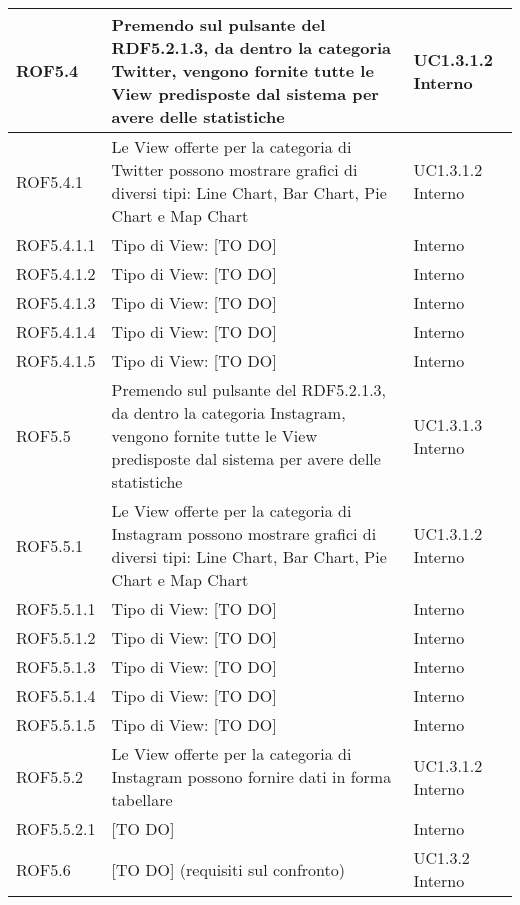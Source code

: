 \begin{center}
\begin{longtable}{| p{2cm} | p{8cm} | p{2cm} |}
		ROF5.4  &  Premendo sul pulsante del RDF5.2.1.3, da dentro la categoria Twitter, vengono fornite tutte le View predisposte dal sistema per avere delle statistiche &  UC1.3.1.2 \newline Interno \\
		\hline
		ROF5.4.1  & Le View offerte per la categoria di Twitter possono mostrare grafici di diversi tipi: Line Chart, Bar Chart, Pie Chart e Map Chart  &  UC1.3.1.2 \newline Interno \\
		\hline
		ROF5.4.1.1  &  Tipo di View: [TO DO] & Interno \\
		\hline	
		ROF5.4.1.2  &  Tipo di View: [TO DO] & Interno \\
		\hline
		ROF5.4.1.3  &  Tipo di View: [TO DO] & Interno \\
		\hline
		ROF5.4.1.4  &  Tipo di View: [TO DO] & Interno \\
		\hline
		ROF5.4.1.5  &  Tipo di View: [TO DO] & Interno \\
		\hline


		ROF5.5  &  Premendo sul pulsante del RDF5.2.1.3, da dentro la categoria Instagram, vengono fornite tutte le View predisposte dal sistema per avere delle statistiche &  UC1.3.1.3 \newline Interno \\
		\hline
		ROF5.5.1  & Le View offerte per la categoria di Instagram possono mostrare grafici di diversi tipi: Line Chart, Bar Chart, Pie Chart e Map Chart  &  UC1.3.1.2 \newline Interno \\
		\hline
		ROF5.5.1.1  &  Tipo di View: [TO DO] & Interno \\
		\hline	
		ROF5.5.1.2  &  Tipo di View: [TO DO] & Interno \\
		\hline
		ROF5.5.1.3  &  Tipo di View: [TO DO] & Interno \\
		\hline
		ROF5.5.1.4  &  Tipo di View: [TO DO] & Interno \\
		\hline
		ROF5.5.1.5  &  Tipo di View: [TO DO] & Interno \\
		\hline
		ROF5.5.2  & Le View offerte per la categoria di Instagram possono fornire dati in forma tabellare  &  UC1.3.1.2 \newline Interno \\
		\hline
		ROF5.5.2.1  &  [TO DO] & Interno \\
		\hline


		ROF5.6  &  [TO DO] (requisiti sul confronto) &  UC1.3.2 \newline Interno \\
		\hline



\end{longtable}
\end{center}
